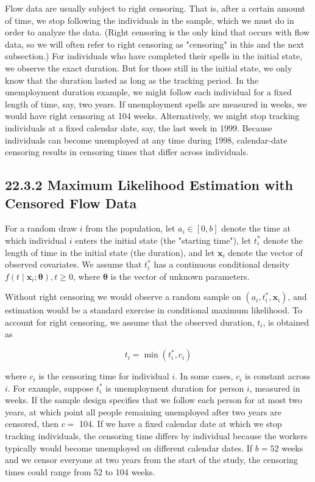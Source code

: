 \documentclass[10pt]{article}
\begin{document}
Flow data are usually subject to right censoring. That is, after a certain amount of time, we stop following the individuals in the sample, which we must do in order to analyze the data. (Right censoring is the only kind that occurs with flow data, so we will often refer to right censoring as "censoring" in this and the next subsection.) For individuals who have completed their spells in the initial state, we observe the exact duration. But for those still in the initial state, we only know that the duration lasted as long as the tracking period. In the unemployment duration example, we might follow each individual for a fixed length of time, say, two years. If unemployment spells are measured in weeks, we would have right censoring at 104 weeks. Alternatively, we might stop tracking individuals at a fixed calendar date, say, the last week in 1999. Because individuals can become unemployed at any time during 1998, calendar-date censoring results in censoring times that differ across individuals.

\subsection*{22.3.2 Maximum Likelihood Estimation with Censored Flow Data}
For a random draw $i$ from the population, let $a_{i} \in[0, b]$ denote the time at which individual $i$ enters the initial state (the "starting time"), let $t_{i}^{*}$ denote the length of time in the initial state (the duration), and let $\mathbf{x}_{i}$ denote the vector of observed covariates. We assume that $t_{i}^{*}$ has a continuous conditional density $f\left(t \mid \mathbf{x}_{i} ; \boldsymbol{\theta}\right), t \geq 0$, where $\boldsymbol{\theta}$ is the vector of unknown parameters.

Without right censoring we would observe a random sample on $\left(a_{i}, t_{i}^{*}, \mathbf{x}_{i}\right)$, and estimation would be a standard exercise in conditional maximum likelihood. To account for right censoring, we assume that the observed duration, $t_{i}$, is obtained as


\begin{equation*}
t_{i}=\min \left(t_{i}^{*}, c_{i}\right) \tag{22.21}
\end{equation*}


where $c_{i}$ is the censoring time for individual $i$. In some cases, $c_{i}$ is constant across $i$. For example, suppose $t_{i}^{*}$ is unemployment duration for person $i$, measured in weeks. If the sample design specifies that we follow each person for at most two years, at which point all people remaining unemployed after two years are censored, then $c=$ 104. If we have a fixed calendar date at which we stop tracking individuals, the censoring time differs by individual because the workers typically would become unemployed on different calendar dates. If $b=52$ weeks and we censor everyone at two years from the start of the study, the censoring times could range from 52 to 104 weeks.
\end{document}
